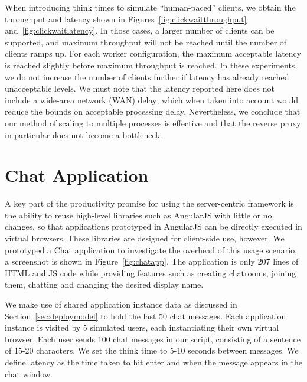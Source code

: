 When introducing think times to simulate ``human-paced'' clients, we obtain the
throughput and latency shown in Figures~\ref{fig:clickwaitthroughput} 
and~\ref{fig:clickwaitlatency}.  In those cases, a larger number of clients can be
supported, and maximum throughput will not be reached until the number of
clients ramps up.  For each worker configuration, the maximum acceptable latency 
is reached slightly before maximum throughput is reached.  In these experiments,
we do not increase the number of clients further if latency has already reached
unacceptable levels.
We must note that the latency reported here does not include a wide-area network (WAN) delay;
which when taken into account would reduce the bounds on acceptable processing delay.
Nevertheless, we conclude that our method of scaling to multiple processes is effective 
and that the reverse proxy in particular does not become a bottleneck.

\section{Chat Application} 

A key part of the productivity promise for using the server-centric \cb framework
is the ability to reuse high-level libraries such as AngularJS with little or
no changes, so that applications prototyped in AngularJS can be directly
executed in virtual browsers.  These libraries are designed for client-side
use, however.  We prototyped a Chat application to investigate the overhead
of this usage scenario, a screenshot is shown in Figure~\ref{fig:chatapp}.  
The application is only 207 lines of HTML and JS code while providing features such as 
creating chatrooms, joining them, chatting and changing the desired display name.

\chatroomfig{}

We make use of shared application instance data as discussed in Section~\ref{sec:deploymodel}
to hold the last 50 chat messages.  Each application instance is visited by 5 simulated users,
each instantiating their own virtual browser.  Each user sends 100 chat messages in our
script, consisting of a sentence of 15-20 characters.  We set the think time to 5-10 seconds
between messages.  We define latency as the time taken to hit enter and when the  message
appears in the chat window.

\angularchatlatency{}

